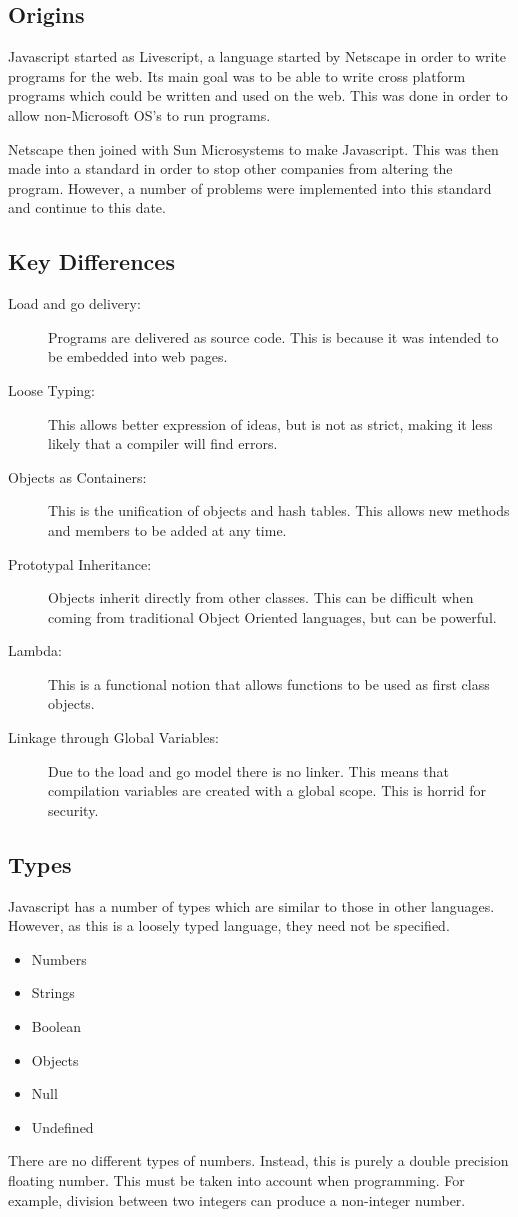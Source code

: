 		\subsection{Origins}
		 
			Javascript started as Livescript, a language started by Netscape in order to write programs for the web.
			Its main goal was to be able to write cross platform programs which could be written and used on the web.
			This was done in order to allow non-Microsoft OS's to run programs.

			Netscape then joined with Sun Microsystems to make Javascript.
			This was then made into a standard in order to stop other companies from altering the program.
			However, a number of problems were implemented into this standard and continue to this date.
		\subsection{Key Differences}
			\begin{description}
				\item[Load and go delivery:] Programs are delivered as source code.
					This is because it was intended to be embedded into web pages.
				\item[Loose Typing:] This allows better expression of ideas,
					but is not as strict, making it less likely that a compiler will find errors.
				\item[Objects as Containers:] This is the unification of objects and hash tables.
					This allows new methods and members to be added at any time.
				\item[Prototypal Inheritance:] Objects inherit directly from other classes.
					This can be difficult when coming from traditional Object Oriented languages, but can be powerful.
				\item[Lambda:] This is a functional notion that allows functions to be used as first class objects.
				\item[Linkage through Global Variables:] Due to the load and go model there is no linker.
					This means that compilation variables are created with a global scope.
					This is horrid for security.
			\end{description}
		\subsection{Types}
			Javascript has a number of types which are similar to those in other languages.
			However, as this is a loosely typed language, they need not be specified.
			\begin{itemize}
				\item Numbers
				\item Strings
				\item Boolean
				\item Objects
				\item Null
				\item Undefined
			\end{itemize}
			There are no different types of numbers.
			Instead, this is purely a double precision floating number.
			This must be taken into account when programming.
			For example, division between two integers can produce a non-integer number.

